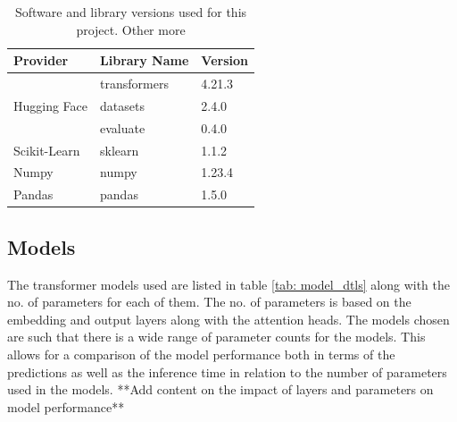 \begin{table}[ht]
    \captionsetup{font=small}
    \centering
    \begin{tabularx}{\textwidth}{|X|X|X|}
        \hline
        \rowcolor[gray]{0.7}
        \multirow{-3}{*}{} \textbf{Provider} & \textbf{Library Name} & \textbf{Version} \\
        \hline
        \multirow{3}{*}{Hugging Face} & transformers & 4.21.3 \\
        \cline{2-3}
        & datasets & 2.4.0 \\
        \cline{2-3}
        & evaluate & 0.4.0 \\
        \hline
        Scikit-Learn & sklearn & 1.1.2 \\
        \hline
        Numpy & numpy & 1.23.4 \\
        \hline
        Pandas & pandas & 1.5.0 \\
        \hline
    \end{tabularx}
    \caption{Software and library versions used for this project. Other more }    
    \label{tab: libs_used}
\end{table}

\subsection{Models}
The transformer models used are listed in table \ref{tab: model_dtls} along with the no. of parameters for each of them. The no. of parameters is based on the embedding and output layers along with the attention heads. The models chosen are such that there is a wide range of parameter counts for the models. This allows for a comparison of the model performance both in terms of the predictions as well as the inference time in relation to the number of parameters used in the models. **Add content on the impact of layers and parameters on model performance**


